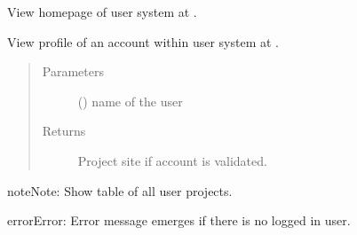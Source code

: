 \documentclass[a4paper,12pt,english]{sphinxmanual}
\begin{document}
\begin{fulllineitems}
\label{\detokenize{project_rst/user_rst/routes:project.user.views.main}}
View homepage of user system at .

\end{fulllineitems}


\begin{fulllineitems}
\label{\detokenize{project_rst/user_rst/routes:project.user.views.profile}}
View profile of an account within user system at .
\begin{quote}\begin{description}
\item[{Parameters}] \leavevmode
{} () \textendash{} name of the user

\item[{Returns}] \leavevmode
Project site if account is validated.

\end{description}\end{quote}

\begin{sphinxadmonition}{note}{Note:}
Show table of all user projects.
\end{sphinxadmonition}

\begin{sphinxadmonition}{error}{Error:}
Error message emerges if there is no logged in user.
\end{sphinxadmonition}

\end{fulllineitems}

\end{document}
